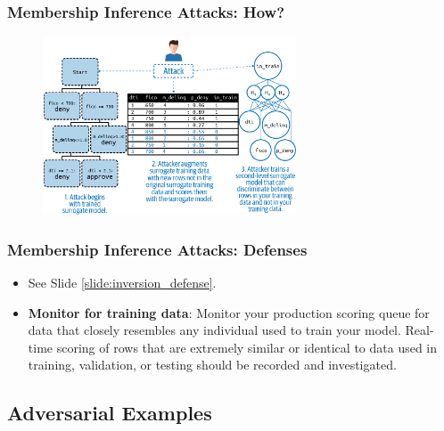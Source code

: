 \documentclass[11pt,
               aspectratio=169,
               hyperref={colorlinks}
               ]{beamer}
\begin{document}
			\begin{frame}[label={slide:membership}]
		
				\frametitle{Membership Inference Attacks: \textbf{How?}}		
			
				\begin{figure}[htb]
					\begin{center}
						\includegraphics[height=150pt]{../img/membership_inference.png}
					\end{center}
				\end{figure}	


			\end{frame}
			
			\begin{frame}
		
				\frametitle{Membership Inference Attacks: \textbf{Defenses}}		
			
				\begin{itemize}
					\Large
					\item See Slide \ref{slide:inversion_defense}.
				\item \textbf{Monitor for training data}: Monitor your production scoring queue for data that closely resembles any individual used to train your model. Real-time scoring of rows that are extremely similar or identical to data used in training, validation, or testing should be recorded and investigated.
				\end{itemize}

			\end{frame}
	
		\subsection{Adversarial Examples}
	
\end{document}
